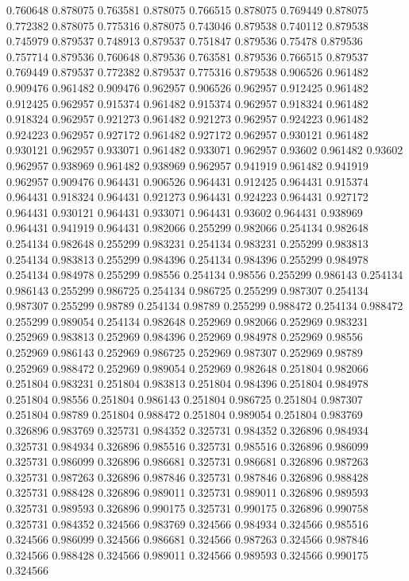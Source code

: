 0.760648 0.878075
0.763581 0.878075
0.766515 0.878075
0.769449 0.878075
0.772382 0.878075
0.775316 0.878075
0.743046 0.879538
0.740112 0.879538
0.745979 0.879537
0.748913 0.879537
0.751847 0.879536
0.75478 0.879536
0.757714 0.879536
0.760648 0.879536
0.763581 0.879536
0.766515 0.879537
0.769449 0.879537
0.772382 0.879537
0.775316 0.879538
0.906526 0.961482
0.909476 0.961482
0.909476 0.962957
0.906526 0.962957
0.912425 0.961482
0.912425 0.962957
0.915374 0.961482
0.915374 0.962957
0.918324 0.961482
0.918324 0.962957
0.921273 0.961482
0.921273 0.962957
0.924223 0.961482
0.924223 0.962957
0.927172 0.961482
0.927172 0.962957
0.930121 0.961482
0.930121 0.962957
0.933071 0.961482
0.933071 0.962957
0.93602 0.961482
0.93602 0.962957
0.938969 0.961482
0.938969 0.962957
0.941919 0.961482
0.941919 0.962957
0.909476 0.964431
0.906526 0.964431
0.912425 0.964431
0.915374 0.964431
0.918324 0.964431
0.921273 0.964431
0.924223 0.964431
0.927172 0.964431
0.930121 0.964431
0.933071 0.964431
0.93602 0.964431
0.938969 0.964431
0.941919 0.964431
0.982066 0.255299
0.982066 0.254134
0.982648 0.254134
0.982648 0.255299
0.983231 0.254134
0.983231 0.255299
0.983813 0.254134
0.983813 0.255299
0.984396 0.254134
0.984396 0.255299
0.984978 0.254134
0.984978 0.255299
0.98556 0.254134
0.98556 0.255299
0.986143 0.254134
0.986143 0.255299
0.986725 0.254134
0.986725 0.255299
0.987307 0.254134
0.987307 0.255299
0.98789 0.254134
0.98789 0.255299
0.988472 0.254134
0.988472 0.255299
0.989054 0.254134
0.982648 0.252969
0.982066 0.252969
0.983231 0.252969
0.983813 0.252969
0.984396 0.252969
0.984978 0.252969
0.98556 0.252969
0.986143 0.252969
0.986725 0.252969
0.987307 0.252969
0.98789 0.252969
0.988472 0.252969
0.989054 0.252969
0.982648 0.251804
0.982066 0.251804
0.983231 0.251804
0.983813 0.251804
0.984396 0.251804
0.984978 0.251804
0.98556 0.251804
0.986143 0.251804
0.986725 0.251804
0.987307 0.251804
0.98789 0.251804
0.988472 0.251804
0.989054 0.251804
0.983769 0.326896
0.983769 0.325731
0.984352 0.325731
0.984352 0.326896
0.984934 0.325731
0.984934 0.326896
0.985516 0.325731
0.985516 0.326896
0.986099 0.325731
0.986099 0.326896
0.986681 0.325731
0.986681 0.326896
0.987263 0.325731
0.987263 0.326896
0.987846 0.325731
0.987846 0.326896
0.988428 0.325731
0.988428 0.326896
0.989011 0.325731
0.989011 0.326896
0.989593 0.325731
0.989593 0.326896
0.990175 0.325731
0.990175 0.326896
0.990758 0.325731
0.984352 0.324566
0.983769 0.324566
0.984934 0.324566
0.985516 0.324566
0.986099 0.324566
0.986681 0.324566
0.987263 0.324566
0.987846 0.324566
0.988428 0.324566
0.989011 0.324566
0.989593 0.324566
0.990175 0.324566
